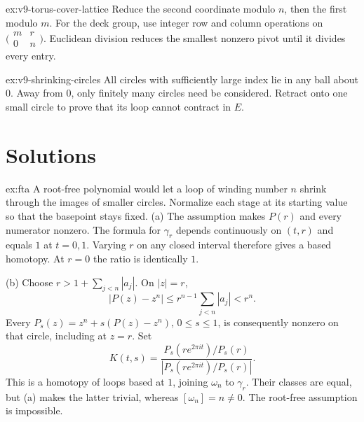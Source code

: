 \begin{hint}{ex:v9-torus-cover-lattice}
Reduce the second coordinate modulo $n$, then the first modulo $m$. For the deck group, use integer row and column operations on $\bigl(\begin{smallmatrix}m&r\\0&n\end{smallmatrix}\bigr)$. Euclidean division reduces the smallest nonzero pivot until it divides every entry.
\end{hint}
\begin{hint}{ex:v9-shrinking-circles}
All circles with sufficiently large index lie in any ball about $0$. Away from $0$, only finitely many circles need be considered. Retract onto one small circle to prove that its loop cannot contract in $E$.
\end{hint}

\section{Solutions}

\begin{solution}{ex:fta}
\idea A root-free polynomial would let a loop of winding number $n$ shrink through the images of smaller circles. Normalize each stage at its starting value so that the basepoint stays fixed.
\writeup (a) The assumption makes $P(r)$ and every numerator nonzero. The formula for $\gamma_r$ depends continuously on $(t,r)$ and equals $1$ at $t=0,1$. Varying $r$ on any closed interval therefore gives a based homotopy. At $r=0$ the ratio is identically $1$.

(b) Choose $r>1+\sum_{j<n}|a_j|$. On $|z|=r$,
\[
|P(z)-z^n|\le r^{n-1}\sum_{j<n}|a_j|<r^n.
\]
Every $P_s(z)=z^n+s(P(z)-z^n)$, $0\le s\le1$, is consequently nonzero on that circle, including at $z=r$. Set
\[
K(t,s)=\frac{P_s(re^{2\pi it})/P_s(r)}{|P_s(re^{2\pi it})/P_s(r)|}.
\]
This is a homotopy of loops based at $1$, joining $\omega_n$ to $\gamma_r$. Their classes are equal, but (a) makes the latter trivial, whereas $[\omega_n]=n\ne0$. The root-free assumption is impossible.
\end{solution}

